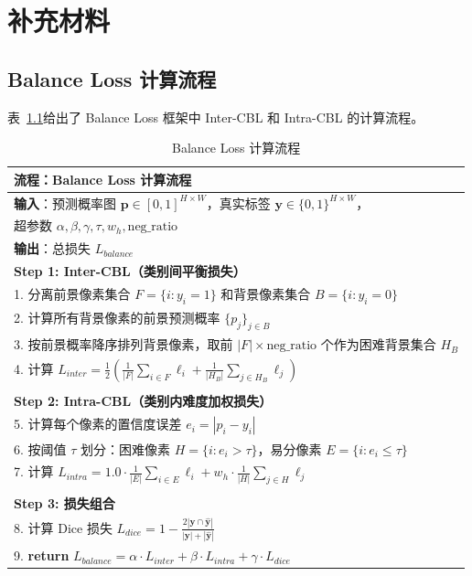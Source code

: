 \chapter{补充材料}

\section{Balance Loss 计算流程}

表~\ref{tab:balance_loss_flow}给出了 Balance Loss 框架中 Inter-CBL 和 Intra-CBL 的计算流程。

\begin{table}[htbp]
\centering
\caption{Balance Loss 计算流程}
\label{tab:balance_loss_flow}
\begin{tabular}{p{}}
\hline
\textbf{流程}：Balance Loss 计算流程 \\
\hline
\textbf{输入}：预测概率图 $\mathbf{p} \in [0,1]^{H \times W}$，真实标签 $\mathbf{y} \in \{0,1\}^{H \times W}$，\\
\quad\quad\quad 超参数 $\alpha, \beta, \gamma, \tau, w_h, \text{neg\_ratio}$ \\
\textbf{输出}：总损失 $L_{balance}$ \\
\hline
\textbf{Step 1: Inter-CBL（类别间平衡损失）} \\
1. 分离前景像素集合 $F = \{i : y_i = 1\}$ 和背景像素集合 $B = \{i : y_i = 0\}$ \\
2. 计算所有背景像素的前景预测概率 $\{p_j\}_{j \in B}$ \\
3. 按前景概率降序排列背景像素，取前 $|F| \times \text{neg\_ratio}$ 个作为困难背景集合 $H_B$ \\
4. 计算 $L_{inter} = \frac{1}{2}\left(\frac{1}{|F|}\sum_{i \in F} \ell_i + \frac{1}{|H_B|}\sum_{j \in H_B} \ell_j\right)$ \\
\\
\textbf{Step 2: Intra-CBL（类别内难度加权损失）} \\
5. 计算每个像素的置信度误差 $e_i = |p_i - y_i|$ \\
6. 按阈值 $\tau$ 划分：困难像素 $H = \{i : e_i > \tau\}$，易分像素 $E = \{i : e_i \leq \tau\}$ \\
7. 计算 $L_{intra} = 1.0 \cdot \frac{1}{|E|}\sum_{i \in E} \ell_i + w_h \cdot \frac{1}{|H|}\sum_{j \in H} \ell_j$ \\
\\
\textbf{Step 3: 损失组合} \\
8. 计算 Dice 损失 $L_{dice} = 1 - \frac{2|\mathbf{y} \cap \hat{\mathbf{y}}|}{|\mathbf{y}| + |\hat{\mathbf{y}}|}$ \\
9. \textbf{return} $L_{balance} = \alpha \cdot L_{inter} + \beta \cdot L_{intra} + \gamma \cdot L_{dice}$ \\
\hline
\end{tabular}
\end{table}

